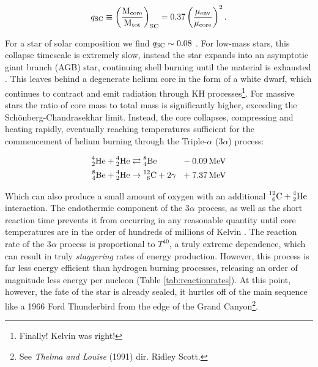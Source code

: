 \begin{equation}
  q\rms{SC} \equiv \left(\frac{\mass\rms{core}}{\mass\rms{tot}}\right)\rms{SC} = 0.37 \left(\frac{\mu\rms{env}}{\mu\rms{core}}\right)^2 .
\end{equation}

\noindent
For a star of solar composition we find $q\rms{SC} \sim 0.08$
\parencite[Ch.~5]{salarisEvolutionStarsStellar2005}.
For low-mass stars, this collapse timescale is extremely slow, instead the star expands into an asymptotic giant branch (AGB) star, continuing shell burning until the material is exhausted
\parencite{beechSchoenbergChandrasekharLimitPolytropic1988}.
This leaves behind a degenerate helium core in the form of a white dwarf, which continues to contract and emit radiation through KH processes\footnote{Finally! Kelvin was right!}.
For massive stars the ratio of core mass to total mass is significantly higher, exceeding the Sch{\"o}nberg-Chandrasekhar limit.
Instead, the core collapses, compressing and heating rapidly, eventually reaching temperatures sufficient for the commencement of helium burning through the Triple-$\alpha$ (3$\alpha$) process:

\begin{equation}
  \begin{alignedat}{3}
    \atom{He}{4}{2} + \atom{He}{4}{2} & \rightleftarrows \atom{Be}{8}{4} && ~~ - \SI{0.09}{\mega\electronvolt} \\
    \atom{Be}{8}{4} + \atom{He}{4}{2} & \rightarrow \atom{C}{12}{6} + 2\gamma && ~~ + \SI{7.37}{\mega\electronvolt} 
  \end{alignedat}
\end{equation}

\noindent
Which can also produce a small amount of oxygen with an additional $\atom{C}{12}{6} + \atom{He}{4}{2}$ interaction.
The endothermic component of the 3$\alpha$ process, as well as the short reaction time prevents it from occurring in any reasonable quantity until core temperatures are in the order of hundreds of millions of Kelvin
\parencite[Pt.~6]{kippenhahnStellarStructureEvolution2012}.
The reaction rate of the 3$\alpha$ process is proportional to $T^{40}$, a truly extreme dependence, which can result in truly \emph{staggering} rates of energy production.
However, this process is far less energy efficient than hydrogen burning processes, releasing an order of magnitude less energy per nucleon (Table \ref{tab:reactionrates}).
At this point, however, the fate of the star is already sealed, it hurtles off of the main sequence like a 1966 Ford Thunderbird from the edge of the Grand Canyon\footnote{See \emph{Thelma and Louise} (1991) dir. Ridley Scott.}.

